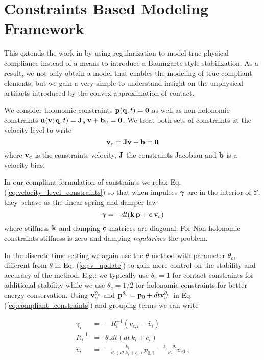 \section{Constraints Based Modeling Framework}
\label{sec:constraints_based_modeling_framework}

This extends the work in \cite{bib:todorov2014} by using regularization to model
true physical compliance instead of a means to introduce a Baumgarte-style
stabilization. As a result, we not only obtain a model that enables the modeling
of true compliant elements, but we gain a very simple to understand insight on
the unphysical artifacts introduced by the convex approximation of contact.

We consider holonomic constraints ${\mathbf{p}}({\mathbf{q}};t)={\mathbf{0}}$ as well as
non-holonomic constraints ${\mathbf{u}}({\mathbf{v}}; {\mathbf{q}},t)={\mathbf{J}}_u\,{\mathbf{v}}+{\mathbf{b}}_u=
{\mathbf{0}}$. We treat both sets of constraints at the velocity level to write
\begin{equation}
	\mf{v}_c = \mf{J}\mf{v}+\mf{b}=\mf{0}
	\label{eq:velocity_level_constraints}
\end{equation}
where ${\mathbf{v}}_c$ is the constraints velocity, ${\mathbf{J}}$ the constraints Jacobian
and ${\mathbf{b}}$ is a velocity bias.

In our compliant formulation of constraints we relax Eq.
(\ref{eq:velocity_level_constraints}) so that when impulses ${\bm\gamma}$ are in the
interior of $\mathcal{C}$, they behave as the linear spring and damper law
\begin{equation}
	\bgamma = -dt(\mf{k}\,\mf{p} + \mf{c}\,\mf{v}_c)
	\label{eq:compliant_constraints}
\end{equation}
where stiffness ${\mathbf{k}}$ and damping ${\mathbf{c}}$ matrices are diagonal. For
Non-holonomic constraints stiffness is zero and damping \textit{regularizes} the
problem.

In the discrete time setting we again use the $\theta\text{-method}$ with
parameter $\theta_c$, different from $\theta$ in Eq.
(\ref{eq:v_update}) to gain more control on the stability and
accuracy of the method. E.g.: we typically use $\theta_c=1$ for contact
constraints for additional stability while we use $\theta_c=1/2$ for holonomic
constraints for better energy conservation. Using ${\mathbf{v}}_c^{\theta_c}$ and
${\mathbf{p}}^{\theta_c}={\mathbf{p}}_0+dt{\mathbf{v}}_c^{\theta_c}$ in Eq.
(\ref{eq:compliant_constraints}) and grouping terms we can write

\begin{eqnarray}
	\gamma_i &=& -R_i^{-1}(v_{c,i}-\hat{v}_i)\nonumber\\
	R_i^{-1} &=& \theta_c dt (dt\,k_i+c_i)\nonumber\\
	\hat{v}_i &=& -\frac{k_i}{\theta_c(dt\,k_i+c_i)}p_{0,i}-
	              \frac{1-\theta_c}{\theta_c}v_{c0,i}
\end{eqnarray}

